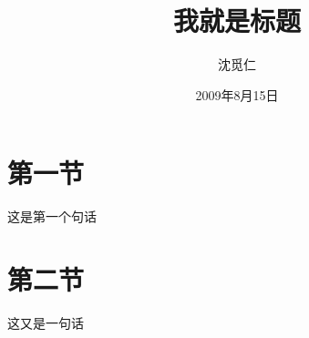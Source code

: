\documentclass[b5paper, 10pt]{article}
\begin{document}
\title{我就是标题}
\author{沈觅仁}
\date{2009年8月15日}

\maketitle
\setcounter{tocdepth}{2}
\tableofcontents

\section{第一节}
这是第一个句话

\section{第二节}
这又是一句话
\end{document}
